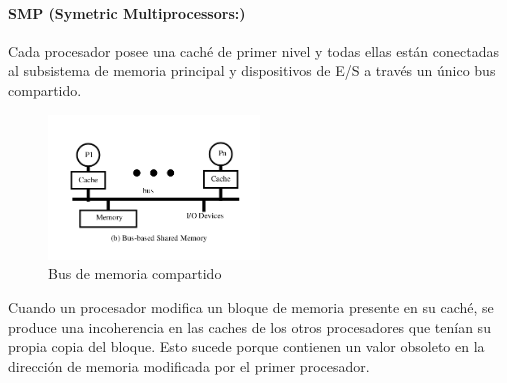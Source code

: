 \paragraph{SMP (Symetric Multiprocessors:)} Cada procesador posee una caché de primer nivel y todas ellas están conectadas al subsistema de memoria principal y dispositivos de E/S a través un único bus compartido.

\begin{figure}[ht]
	\centering
	\includegraphics[width=0.5\textwidth]{imagenes/multiprocesor-caches}
	\caption{Bus de memoria compartido}
	\label{fig:busCompartido}
\end{figure}

Cuando un procesador modifica un bloque de memoria presente en su caché, se produce una incoherencia en las caches de los otros procesadores que tenían su propia copia del bloque. Esto sucede porque contienen un valor obsoleto en la dirección de memoria modificada por el primer procesador.

%

